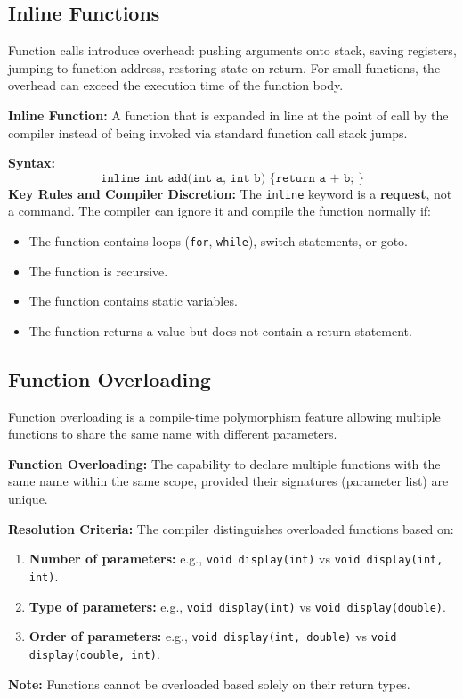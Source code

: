 \documentclass[12pt,a4paper]{article}
\begin{document}
\subsection{Inline Functions}
Function calls introduce overhead: pushing arguments onto stack, saving registers, jumping to function address, restoring state on return. For small functions, the overhead can exceed the execution time of the function body.
\begin{tcolorbox}[defbox]
\textbf{Inline Function:} A function that is expanded in line at the point of call by the compiler instead of being invoked via standard function call stack jumps.
\end{tcolorbox}
\textbf{Syntax:}
\begin{equation}
  \texttt{inline int add(int a, int b) \{ return a + b; \}}
\end{equation}
\textbf{Key Rules and Compiler Discretion:}
The \texttt{inline} keyword is a \textbf{request}, not a command. The compiler can ignore it and compile the function normally if:
\begin{itemize}[leftmargin=*, itemsep=1pt, topsep=1pt]
  \item The function contains loops (\texttt{for}, \texttt{while}), switch statements, or goto.
  \item The function is recursive.
  \item The function contains static variables.
  \item The function returns a value but does not contain a return statement.
\end{itemize}

\subsection{Function Overloading}
Function overloading is a compile-time polymorphism feature allowing multiple functions to share the same name with different parameters.
\begin{tcolorbox}[defbox]
\textbf{Function Overloading:} The capability to declare multiple functions with the same name within the same scope, provided their signatures (parameter list) are unique.
\end{tcolorbox}
\textbf{Resolution Criteria:} The compiler distinguishes overloaded functions based on:
\begin{enumerate}[label=\textbf{\arabic*.}, leftmargin=1.5em, itemsep=1pt]
  \item \textbf{Number of parameters:} e.g., \texttt{void display(int)} vs \texttt{void display(int, int)}.
  \item \textbf{Type of parameters:} e.g., \texttt{void display(int)} vs \texttt{void display(double)}.
  \item \textbf{Order of parameters:} e.g., \texttt{void display(int, double)} vs \texttt{void display(double, int)}.
\end{enumerate}
\textbf{Note:} Functions cannot be overloaded based solely on their return types.
\end{document}
